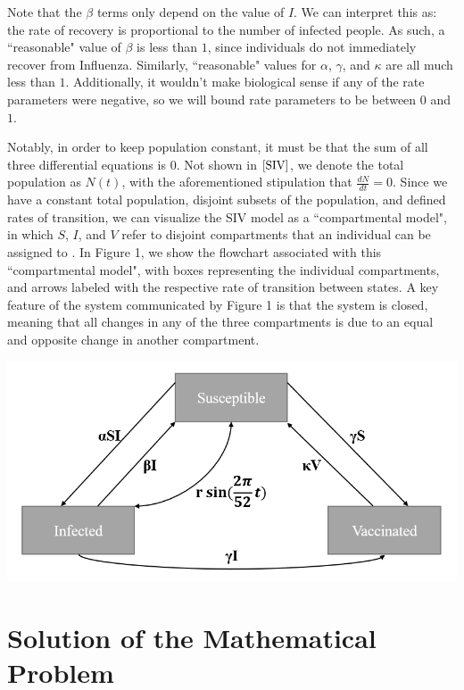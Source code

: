 \documentclass[12pt]{article}
\newenvironment{Figure}
  {\par\medskip\noindent\minipage{\linewidth}}
  {\endminipage\par\medskip}
\begin{document}
Note that the $\beta$ terms only depend on the value of $I$. We can interpret this as: the rate of recovery is proportional to the number of infected people. As such, a ``reasonable" value of $\beta$ is less than $1$, since individuals do not immediately recover from Influenza. Similarly, ``reasonable" values for $\alpha$, $\gamma$, and $\kappa$ are all much less than $1$. Additionally, it wouldn't make biological sense if any of the rate parameters were negative, so we will bound rate parameters to be between $0$ and $1$.

Notably, in order to keep population constant, it must be that the sum of all three differential equations is $0$. Not shown in $\ref{SIV}$, we denote the total population as $N(t)$, with the aforementioned stipulation that $\frac{dN}{dt} = 0$. Since we have a constant total population, disjoint subsets of the population, and defined rates of transition, we can visualize the SIV model as a ``compartmental model", in which $S$, $I$, and $V$ refer to disjoint compartments that an individual can be assigned to \citep{brauer2008compartmental}. In Figure 1, we show the flowchart associated with this ``compartmental model", with boxes representing the individual compartments, and arrows labeled with the respective rate of transition between states. A key feature of the system communicated by Figure 1 is that the system is closed, meaning that all changes in any of the three compartments is due to an equal and opposite change in another compartment.

\begin{Figure}
    \centering
    \includegraphics[width = \linewidth]{SIV_flowchart.PNG}
\end{Figure}

\section{Solution of the Mathematical Problem}
\end{document}
